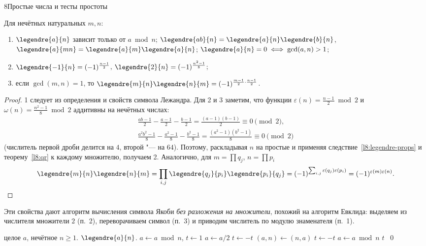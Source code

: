 \begin{lecture}{8}{Простые числа и тесты простоты}
\begin{proposition}\label{l8:jacobi-props}
Для нечётных натуральных $m, n$:
\begin{enumerate}
  \item $\legendre{a}{n}$ зависит только от $a \bmod n$; $\legendre{ab}{n} = \legendre{a}{n}\legendre{b}{n}$,
    $\legendre{a}{mn} = \legendre{a}{m}\legendre{a}{n}$; $\legendre{a}{n} = 0 \iff \gcd(a, n) > 1$;
  \item $\legendre{-1}{n} = (-1)^{\frac{n-1}{2}}$, \quad $\legendre{2}{n} = (-1)^{\frac{n^2-1}{8}}$;
  \item если $\gcd(m, n) = 1$, то $\legendre{m}{n}\legendre{n}{m} = (-1)^{\frac{m-1}{2}\cdot\frac{n-1}{2}}$.
\end{enumerate}
\end{proposition}

\begin{proof}
1 следует из определения и свойств символа Лежандра. Для 2 и 3 заметим, что функции
$\varepsilon(n) = \frac{n-1}{2} \bmod 2$ и $\omega(n) = \frac{n^2-1}{8} \bmod 2$ аддитивны на
нечётных числах:
\begin{gather*}
  \frac{ab - 1}{2} - \frac{a - 1}{2} - \frac{b - 1}{2} = \frac{(a - 1)(b - 1)}{2} \equiv 0 \pmod 2,\\
  \frac{a^2b^2 - 1}{8} - \frac{a^2 - 1}{8} - \frac{b^2 - 1}{8} = \frac{(a^2 - 1)(b^2 - 1)}{8} \equiv 0
  \pmod 2
\end{gather*}
(числитель первой дроби делится на $4$, второй "--- на $64$). Поэтому, раскладывая $n$ на
простые и применяя следствие~\ref{l8:legendre-props} и теорему~\ref{l8:qr} к каждому
множителю, получаем 2. Аналогично, для $m = \prod q_j$, $n = \prod p_i$
\[
  \legendre{m}{n}\legendre{n}{m} = \prod_{i,j} \legendre{q_j}{p_i}\legendre{p_i}{q_j}
  = (-1)^{\sum_{i,j} \varepsilon(q_j)\varepsilon(p_i)} = (-1)^{\varepsilon(m)\varepsilon(n)}. \qedhere
\]
\end{proof}

Эти свойства дают алгоритм вычисления символа Якоби \emph{без разложения на множители},
похожий на алгоритм Евклида: выделяем из числителя множители $2$ (п.~2), переворачиваем
символ (п.~3) и приводим числитель по модулю знаменателя (п.~1).

\begin{algorithm}\label{l8:alg-jacobi}
\begin{algorithmic}[1]
\Require целое $a$, нечётное $n \ge 1$.
\Ensure $\legendre{a}{n}$.
\State $a \gets a \bmod n$, \quad $t \gets 1$
    \State $a \gets a/2$
     $t \gets -t$ \EndIf
  \EndWhile
  \State $(a, n) \gets (n, a)$ 
   $t \gets -t$ \EndIf
  \State $a \gets a \bmod n$
\EndWhile
{} \Return $t$ \Else\ \Return $0$ \EndIf
\end{algorithmic}
\end{algorithm}


\end{lecture}

